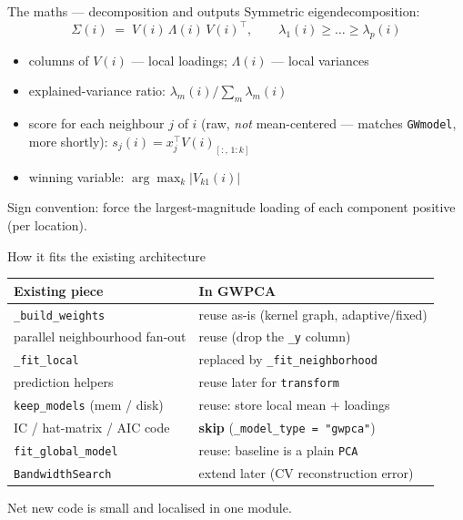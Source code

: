 \documentclass[10pt]{beamer}
\begin{document}
\begin{frame}{The maths --- decomposition and outputs}
  Symmetric eigendecomposition:
  \[
    \Sigma(i) \;=\; V(i)\,\Lambda(i)\,V(i)^{\!\top},
    \qquad \lambda_1(i) \ge \dots \ge \lambda_p(i)
  \]
  \begin{itemize}
    \item columns of $V(i)$ --- local loadings; $\Lambda(i)$ --- local
      variances
    \item explained-variance ratio: $\lambda_m(i) / \sum_m \lambda_m(i)$
    \item score for each neighbour $j$ of $i$ (raw, \emph{not}
      mean-centered --- matches \texttt{GWmodel}, more shortly):
      $s_j(i) = x_j^{\!\top} V(i)_{[:,\,1:k]}$
    \item winning variable: $\displaystyle \arg\max_k \bigl|V_{k1}(i)\bigr|$
  \end{itemize}
  \vspace{0.4em}
  \footnotesize Sign convention: force the largest-magnitude loading of
  each component positive (per location).
\end{frame}

\begin{frame}{How it fits the existing architecture}
  \begin{center}
  \small
  \begin{tabular}{@{}ll@{}}
    \toprule
    \textbf{Existing piece} & \textbf{In GWPCA} \\
    \midrule
    \texttt{\_build\_weights} & reuse as-is (kernel graph, adaptive/fixed) \\
    parallel neighbourhood fan-out & reuse (drop the \texttt{\_y} column) \\
    \texttt{\_fit\_local} & replaced by \texttt{\_fit\_neighborhood} \\
    prediction helpers & reuse later for \texttt{transform} \\
    \texttt{keep\_models} (mem / disk) & reuse: store local mean + loadings \\
    IC / hat-matrix / AIC code & \textbf{skip} (\texttt{\_model\_type = "gwpca"}) \\
    \texttt{fit\_global\_model} & reuse: baseline is a plain \texttt{PCA} \\
    \texttt{BandwidthSearch} & extend later (CV reconstruction error) \\
    \bottomrule
  \end{tabular}
  \end{center}
  \vfill
  \centering
  \normalsize Net new code is small and localised in one module.
\end{frame}
\end{document}
